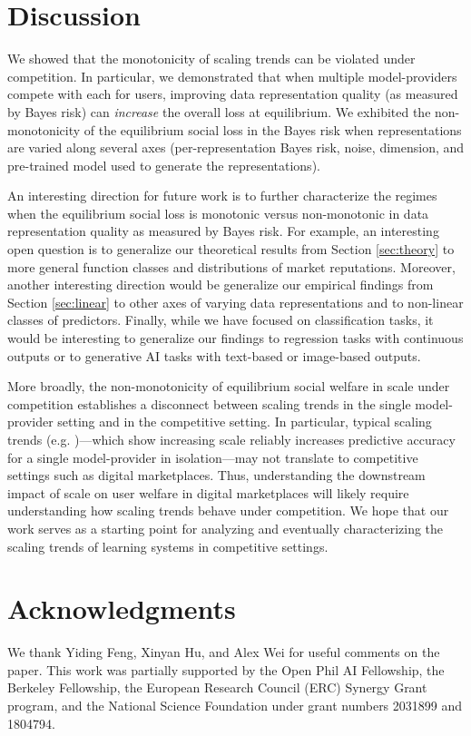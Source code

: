 \documentclass[letterpaper,11pt]{article}
\theoremstyle{plain}
\begin{document}
\section{Discussion} 

We showed that the monotonicity of scaling trends can be violated under competition. In particular, we demonstrated that when multiple model-providers compete with each for users, improving data representation quality (as measured by Bayes risk) can \textit{increase} the overall loss at equilibrium. We exhibited the non-monotonicity of the equilibrium social loss in the Bayes risk when representations are varied along several axes (per-representation Bayes risk, noise, dimension, and pre-trained model used to generate the representations). 

An interesting direction for future work is to further characterize the regimes when the equilibrium social loss is monotonic versus non-monotonic in data representation quality as measured by Bayes risk. For example, an interesting open question is to generalize our theoretical results from Section \ref{sec:theory} to more general function classes and distributions of market reputations. Moreover, another interesting direction would be generalize our empirical findings from Section \ref{sec:linear} to other axes of varying data representations and to non-linear classes of predictors. Finally, while we have focused on classification tasks, it would be interesting to generalize our findings to regression tasks with continuous outputs or to generative AI tasks with text-based or image-based outputs. 

More broadly, the non-monotonicity of equilibrium social welfare in scale under competition establishes a disconnect between scaling trends in the single model-provider setting and in the competitive setting. In particular, typical scaling trends (e.g. \citep{K20, SK20, B21, H22, hernandez2021scaling})---which show increasing scale reliably increases predictive accuracy for a single model-provider in isolation---may not translate to competitive settings such as digital marketplaces. Thus, understanding the downstream impact of scale on user welfare in digital marketplaces will likely require understanding how scaling trends behave under competition. We hope that our work serves as a starting point for analyzing and eventually characterizing the scaling trends of learning systems in competitive settings.

\section{Acknowledgments}
We thank Yiding Feng, Xinyan Hu, and Alex Wei for useful comments on the paper. This work was partially supported by the Open Phil AI Fellowship, the Berkeley Fellowship, the European Research Council (ERC) Synergy Grant program, and the National Science Foundation under grant numbers 2031899 and 1804794. 
\end{document}
